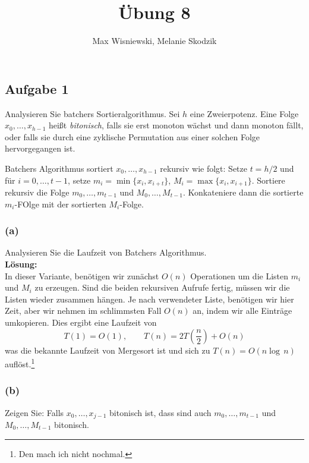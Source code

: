 \documentclass[11pt,a4paper,ngerman]{article}
\date{}
\title{Übung 8}
\author{Max Wisniewski, Melanie Skodzik}
\begin{document}

\renewcommand{\figurename}{Grafik}

\maketitle
\thispagestyle{fancy}


\subsection*{Aufgabe 1}
Analysieren Sie batchers Sortieralgorithmus. Sei $h$ eine Zweierpotenz. Eine Folge $x_0, \ldots, x_{h-1}$ heißt \emph{bitonisch}, falls sie erst
monoton wächst und dann monoton fällt, oder falls sie durch eine zyklische Permutation aus einer solchen Folge hervorgegangen ist.

Batchers Algorithmus sortiert $x_0, \ldots, x_{h-1}$ rekursiv wie folgt: Setze $t = h / 2$ und für $i = 0, \ldots , t-1$, setze $m_i= \min \{x_i, x_{i+t}\}$, $M_i = \max \{x_i, x_{i+1} \}$. Sortiere rekursiv die Folge $m_0,\ldots, m_{t-1}$ und $M_0, \ldots, M_{t-1}$. Konkateniere dann die sortierte $m_i$-FOlge mit der sortierten $M_i$-Folge.

\subsubsection*{(a)}
Analysieren Sie die Laufzeit von Batchers Algorithmus.\\

\noindent\textbf{Lösung:}\\

In dieser Variante, benötigen wir zunächst $O(n)$ Operationen um die Listen $m_i$ und $M_i$ zu erzeugen. Sind die beiden rekursiven Aufrufe fertig,
müssen wir die Listen wieder zusammen hängen. Je nach verwendeter Liste, benötigen wir hier Zeit, aber wir nehmen im schlimmsten Fall $O(n)$ an,
indem wir alle Einträge umkopieren. Dies ergibt eine Laufzeit von
$$
	T(1) = O(1), \qquad T(n) = 2T(\frac{n}{2}) + O(n)
$$
was die bekannte Laufzeit von Mergesort ist und sich zu $T(n) = O(n \log \, n)$ auflöst.\footnote{Den mach ich nicht nochmal.}

\subsubsection*{(b)}
Zeigen Sie: Falls $x_0, \ldots, x_{j-1}$ bitonisch ist, dass sind auch $m_0, \ldots, m_{t-1}$ und $M_0, \ldots, M_{t-1}$ bitonisch.\\
\end{document}

